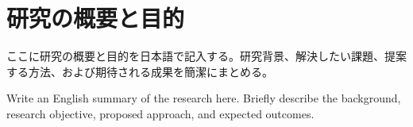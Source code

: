 \documentclass[uplatex,dvipdfmx,a4j,9pt]{jsarticle}
\date{}
\begin{document}
\maketitle


\section*{研究の概要と目的}
ここに研究の概要と目的を日本語で記入する。研究背景、解決したい課題、提案する方法、および期待される成果を簡潔にまとめる。

\vspace{0.5cm}
Write an English summary of the research here. Briefly describe the background, research objective, proposed approach, and expected outcomes.
\vspace{1cm}
\end{document}
